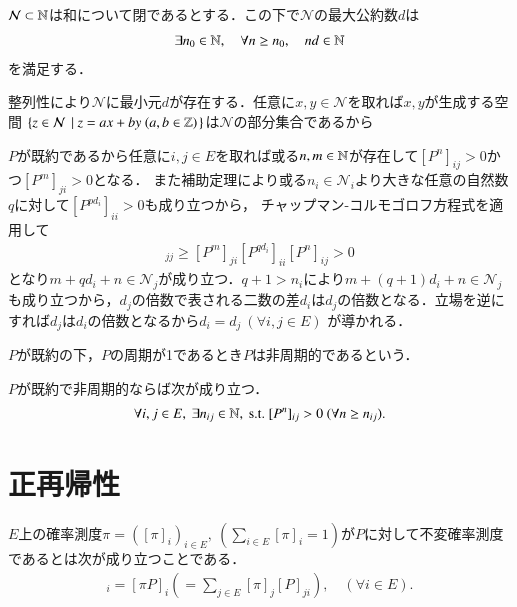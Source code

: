 	\begin{lem}
		$\mathcal{N} \subset \mathbb{N}$は和について閉であるとする．この下で$\mathcal{N}$の最大公約数$d$は
		\begin{align}
			\exists n_0 \in \mathbb{N},\quad \forall n \geq n_0,\quad nd \in \mathbb{N}
		\end{align}
		を満足する．
	\end{lem}
	\begin{prf}[補助定理の証明]
		整列性により$\mathcal{N}$に最小元$d$が存在する．任意に$x,y \in \mathcal{N}$を取れば$x,y$が生成する空間
		$\left\{ z \in \mathcal{N} \ \left|\ z = ax + by\ (a,b \in \mathbb{Z}) \right.\right\}$は$\mathcal{N}$の部分集合であるから
	\end{prf}
	\begin{prf}[命題の証明]
		$P$が既約であるから任意に$i,j \in E$を取れば或る$n,m \in \mathbb{N}$が存在して$[P^n]_{ij} > 0$かつ$[P^m]_{ji} > 0$となる．
		また補助定理により或る$n_i \in \mathcal{N}_i$より大きな任意の自然数$q$に対して$[P^{pd_i}]_{ii} > 0$も成り立つから，
		チャップマン-コルモゴロフ方程式を適用して
		\begin{align}
			[P^{m + qd_i + n}]_{jj} \geq [P^m]_{ji}[P^{q d_i}]_{ii} [P^{n}]_{ij} > 0
		\end{align}
		となり$m + qd_i + n \in \mathcal{N}_j$が成り立つ．$q+1 > n_i$により$m + (q+1)d_i + n \in \mathcal{N}_j$
		も成り立つから，$d_j$の倍数で表される二数の差$d_i$は$d_j$の倍数となる．立場を逆にすれば$d_j$は$d_i$の倍数となるから$d_i = d_j\ (\forall i,j \in E)$
		が導かれる．
	\end{prf}
	
	\begin{dfn}[非周期性]
		$P$が既約の下，$P$の周期が1であるとき$P$は非周期的であるという．
	\end{dfn}
	
	\begin{prp}[非周期性に関する一命題]
		$P$が既約で非周期的ならば次が成り立つ．
		\begin{align}
			\forall i,j \in E,\ \exists n_{ij} \in \N,\ \mathrm{s.t.}\ [P^n]_{ij} > 0 \ (\forall n \geq n_{ij}).
		\end{align}
	\end{prp}

\section{正再帰性}
	\begin{dfn}[不変確率測度]
		$E$上の確率測度$\pi = ([\pi]_i)_{i \in E},\ (\sum_{i \in E} [\pi]_i = 1)$が$P$に対して不変確率測度であるとは次が成り立つことである．
		\begin{align}
			[\pi]_i = [\pi P]_i ( = \sum_{j \in E}[\pi]_j [P]_{ji} ), \quad (\forall i \in E).
		\end{align}
	\end{dfn}
	
